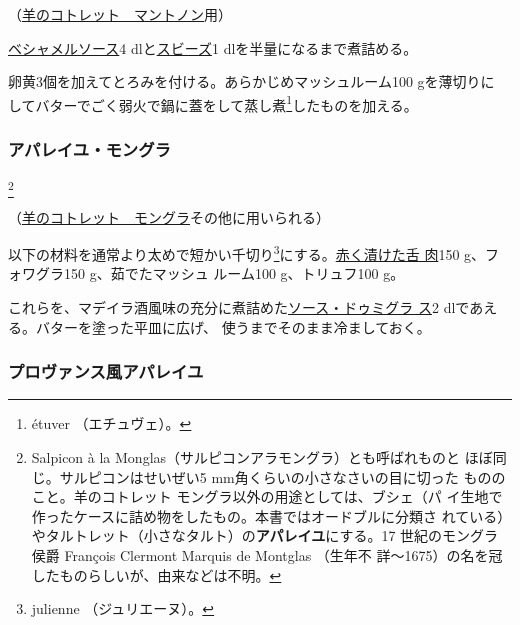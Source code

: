 \begin{recette}
（\protect\hyperlink{cotelettes-maintenon}{羊のコトレット　マントノン}用）

\protect\hyperlink{sauce-bechamel}{ベシャメルソース}4
dlと\protect\hyperlink{sauce-soubise}{スビーズ}1
dlを半量になるまで煮詰める。

卵黄3個を加えてとろみを付ける。あらかじめマッシュルーム100 gを薄切りに
してバターでごく弱火で鍋に蓋をして蒸し煮\footnote{étuver
  （エチュヴェ）。}したものを加える。

\maeaki

\hypertarget{appareil-montglas}{%
\subsubsection{アパレイユ・モングラ}\label{appareil-montglas}}

\footnote{Salpicon à la
  Monglas（サルピコンアラモングラ）とも呼ばれものと
  ほぼ同じ。サルピコンはせいぜい5 mm角くらいの小さなさいの目に切った
  もののこと。羊のコトレット モングラ以外の用途としては、ブシェ（パ
  イ生地で作ったケースに詰め物をしたもの。本書ではオードブルに分類さ
  れている）やタルトレット（小さなタルト）の\textbf{アパレイユ}にする。17
  世紀のモングラ侯爵 François Clermont Marquis de Montglas （生年不
  詳〜1675）の名を冠したものらしいが、由来などは不明。}


（\protect\hyperlink{cotelettes-monglas}{羊のコトレット　モングラ}その他に用いられる）

以下の材料を通常より太めで短かい千切り\footnote{julienne
  （ジュリエーヌ）。}にする。\protect\hyperlink{saumure-liquide-pour-langue}{赤く漬けた舌
肉}150 g、フォワグラ150 g、茹でたマッシュ ルーム100 g、トリュフ100 g。

これらを、マデイラ酒風味の充分に煮詰めた\protect\hyperlink{sauce-demi-glace}{ソース・ドゥミグラ
ス}2\undemi{} dlであえる。バターを塗った平皿に広げ、
使うまでそのまま冷ましておく。

\maeaki

\hypertarget{appareil-provencal}{%
\subsubsection{プロヴァンス風アパレイユ}\label{appareil-provencal}}


\end{recette}
